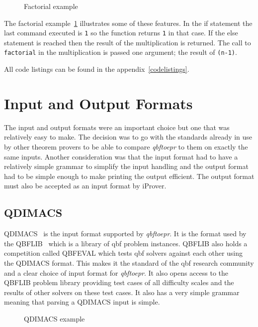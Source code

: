 \begin{figure}[H]
\caption{Factorial example}
\label{factorialexample}
\begin{CenteredBox}

\end{CenteredBox}
\end{figure}

The factorial example~\ref{factorialexample} illustrates some of these features. In the if statement the last command executed is \texttt{1} so the function returns \texttt{1} in that case. If the else statement is reached then the result of the multiplication is returned. The call to \texttt{factorial} in the multiplication is passed one argument; the result of \texttt{(n-1)}.

All code listings can be found in the appendix~\ref{codelistings}.

\section{Input and Output Formats}
The input and output formats were an important choice but one that was relatively easy to make. The decision was to go with the standards already in use by other theorem provers to be able to compare \textit{qbftoepr} to them on exactly the same inputs. Another consideration was that the input format had to have a relatively simple grammar to simplify the input handling and the output format had to be simple enough to make printing the output efficient. The output format must also be accepted as an input format by iProver.

\subsection{QDIMACS}
QDIMACS~\cite{qdimacs} is the input format supported by \textit{qbftoepr}. It is the format used by the QBFLIB~\cite{qbflib} which is a library of \gls{qbf} problem instances. QBFLIB also holds a competition called QBFEVAL which tests \gls{qbf} solvers against each other using the QDIMACS format. This makes it the standard of the \gls{qbf} research community and a clear choice of input format for \textit{qbftoepr}. It also opens access to the QBFLIB problem library providing test cases of all difficulty scales and the results of other solvers on these test cases. It also has a very simple grammar meaning that parsing a QDIMACS input is simple.

\begin{figure}[H]
\caption{QDIMACS example}
\label{qdimacsexample}
\begin{CenteredBox}

\end{CenteredBox}
\end{figure}

